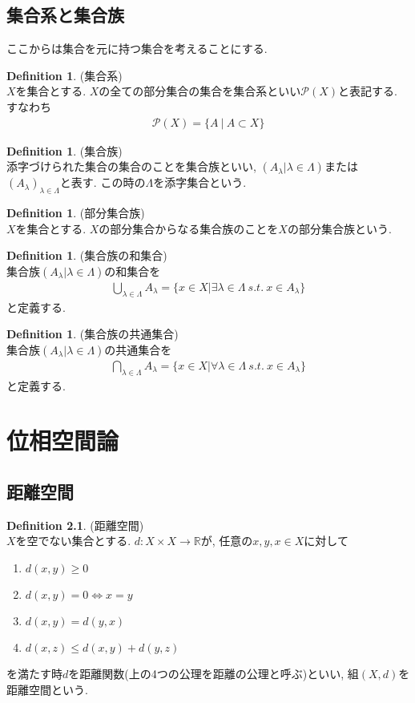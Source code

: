 \documentclass[11pt, a4paper, dvipdfmx]{jsbook}
\theoremstyle{definition}
\newtheorem{Definition+}[Axiom+]{Definition}
\newcommand{\R}{\mathbb{R}}
\begin{document}
\section{集合系と集合族}
ここからは集合を元に持つ集合を考えることにする.
\begin{Definition+}(集合系)\\
  $X$を集合とする. $X$の全ての部分集合の集合を集合系といい$\mathcal{P}(X)$と表記する. すなわち
  \begin{align*}
    \mathcal{P}(X) = \{A~|~ A\subset X\}
  \end{align*}
\end{Definition+}  
\begin{Definition+}(集合族)\\
  添字づけられた集合の集合のことを集合族といい, $(A_{\lambda} | \lambda \in \Lambda)$または$(A_{\lambda})_{\lambda\in\Lambda}$と表す. この時の$\Lambda$を添字集合という.
\end{Definition+}
\begin{Definition+}(部分集合族)\\
  $X$を集合とする. $X$の部分集合からなる集合族のことを$X$の部分集合族という.
\end{Definition+}
\begin{Definition+}(集合族の和集合)\\
  集合族$(A_{\lambda} | \lambda \in \Lambda)$の和集合を
  \begin{align*}
    \bigcup_{\lambda\in\Lambda}A_{\lambda} = \{x\in X| \exists \lambda\in\Lambda ~s.t. ~x\in A_{\lambda}\}
  \end{align*}
  と定義する.
\end{Definition+}
\begin{Definition+}(集合族の共通集合)\\
  集合族$(A_{\lambda} | \lambda \in \Lambda)$の共通集合を
  \begin{align*}
    \bigcap_{\lambda\in\Lambda}A_{\lambda} = \{x\in X| \forall \lambda\in\Lambda ~s.t. ~x\in A_{\lambda}\}
  \end{align*}
  と定義する.
\end{Definition+}
\chapter{位相空間論}
\section{距離空間}
\begin{Definition+}(距離空間)\\
  $X$を空でない集合とする. $d:X\times X\to\R$が, 任意の$x, y, x\in X$に対して
  \begin{enumerate}
    \item $d(x, y) \geq 0$
    \item $d(x, y) = 0\Longleftrightarrow x = y$
    \item $d(x, y) = d(y, x)$
    \item $d(x, z) \leq d(x, y) + d(y, z)$
  \end{enumerate}
  を満たす時$d$を距離関数(上の4つの公理を距離の公理と呼ぶ)といい, 組$(X, d)$を距離空間という.
\end{Definition+}
\end{document}
